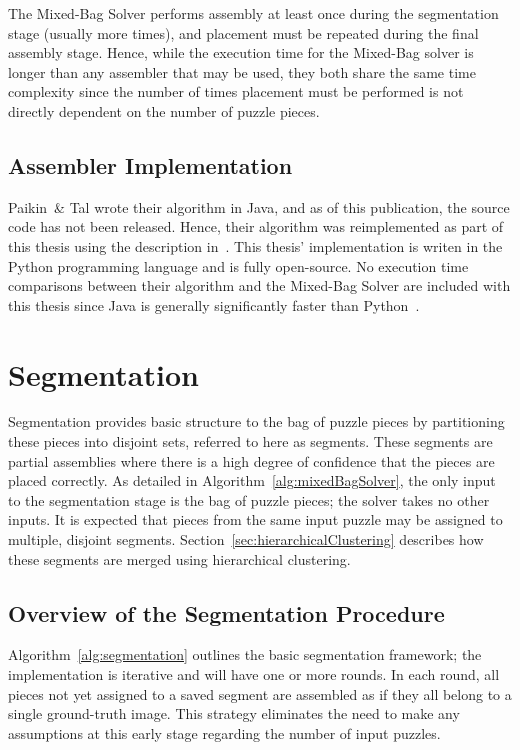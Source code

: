 The Mixed-Bag Solver performs assembly at least once during the segmentation stage (usually more times), and placement must be repeated during the final assembly stage.  Hence, while the execution time for the Mixed-Bag solver is longer than any assembler that may be used, they both share the same time complexity since the number of times placement must be performed is not directly dependent on the number of puzzle pieces.

\subsection{Assembler Implementation}\label{sec:assemblerImplementation}

Paikin~\& Tal wrote their algorithm in Java, and as of this publication, the source code has not been released.  Hence, their algorithm was reimplemented as part of this thesis using the description in~\cite{paikin2015}.  This thesis' implementation is writen in the Python programming language and is fully open-source.  No execution time comparisons between their algorithm and the Mixed-Bag Solver are included with this thesis since Java is generally significantly faster than Python~\cite{pythonJavaComparison}.

\section{Segmentation}\label{sec:Segmentation}

Segmentation provides basic structure to the bag of puzzle pieces by partitioning these pieces into disjoint sets, referred to here as segments.  These segments are partial assemblies where there is a high degree of confidence that the pieces are placed correctly. As detailed in Algorithm~\ref{alg:mixedBagSolver}, the only input to the segmentation stage is the bag of puzzle pieces; the solver takes no other inputs.  It is expected that pieces from the same input puzzle may be assigned to multiple, disjoint segments.  Section~\ref{sec:hierarchicalClustering} describes how these segments are merged using hierarchical clustering.

\subsection{Overview of the Segmentation Procedure}

Algorithm~\ref{alg:segmentation} outlines the basic segmentation framework; the implementation is iterative and will have one or more rounds.  In each round, all pieces not yet assigned to a saved segment are assembled as if they all belong to a single ground-truth image.  This strategy eliminates the need to make any assumptions at this early stage regarding the number of input puzzles. 

